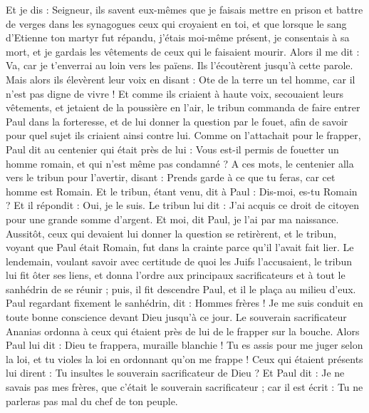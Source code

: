 \begin{multicols}{2}
Et je dis : Seigneur, ils savent eux-mêmes que je faisais mettre en prison et battre de verges dans les synagogues ceux qui croyaient en toi,
et que lorsque le sang d'Etienne ton martyr fut répandu, j’étais moi-même présent, je consentais à sa mort, et je gardais les vêtements de ceux qui le faisaient mourir.
Alors il me dit : Va, car je t'enverrai au loin vers les païens.
Ils l'écoutèrent jusqu'à cette parole. Mais alors ils élevèrent leur voix en disant : Ote de la terre un tel homme, car il n'est pas digne de vivre !
Et comme ils criaient à haute voix, secouaient leurs vêtements, et jetaient de la poussière en l'air,
le tribun commanda de faire entrer Paul dans la forteresse, et de lui donner la question par le fouet, afin de savoir pour quel sujet ils criaient ainsi contre lui.
Comme on l’attachait pour le frapper, Paul dit au centenier qui était près de lui : Vous est-il permis de fouetter un homme romain, et qui n'est même pas condamné ?
A ces mots, le centenier alla vers le tribun pour l'avertir, disant : Prends garde à ce que tu feras, car cet homme est Romain.
Et le tribun, étant venu, dit à Paul : Dis-moi, es-tu Romain ? Et il répondit : Oui, je le suis.
Le tribun lui dit : J'ai acquis ce droit de citoyen pour une grande somme d’argent. Et moi, dit Paul, je l'ai par ma naissance.
Aussitôt, ceux qui devaient lui donner la question se retirèrent, et le tribun, voyant que Paul était Romain, fut dans la crainte parce qu’il l’avait fait lier.
Le lendemain, voulant savoir avec certitude de quoi les Juifs l’accusaient, le tribun lui fit ôter ses liens, et donna l’ordre aux principaux sacrificateurs et à tout le sanhédrin de se réunir ; puis, il fit descendre Paul, et il le plaça au milieu d’eux.
\VerseOne{}Paul regardant fixement le sanhédrin, dit : Hommes frères ! Je me suis conduit en toute bonne conscience devant Dieu jusqu'à ce jour.
Le souverain sacrificateur Ananias ordonna à ceux qui étaient près de lui de le frapper sur la bouche.
Alors Paul lui dit : Dieu te frappera, muraille blanchie ! Tu es assis pour me juger selon la loi, et tu violes la loi en ordonnant qu’on me frappe !
Ceux qui étaient présents lui dirent : Tu insultes le souverain sacrificateur de Dieu ?
Et Paul dit : Je ne savais pas mes frères, que c’était le souverain sacrificateur ; car il est écrit : Tu ne parleras pas mal du chef de ton peuple.

\end{multicols}

